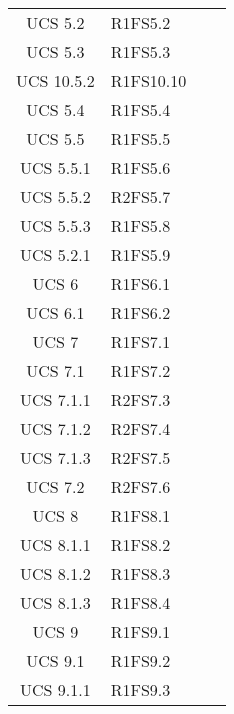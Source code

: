 {\begin{longtable}{ c C{4cm} c c}
UCS 5.2 & R1FS5.2\\

UCS 5.3 & R1FS5.3\\

UCS 10.5.2 & R1FS10.10\\

UCS 5.4 & R1FS5.4\\

UCS 5.5 & R1FS5.5\\


UCS 5.5.1 & R1FS5.6\\

UCS 5.5.2 & R2FS5.7\\

UCS 5.5.3 & R1FS5.8\\

UCS 5.2.1 & R1FS5.9\\

UCS 6 & R1FS6.1\\

UCS 6.1 & R1FS6.2\\

UCS 7 & R1FS7.1\\

UCS 7.1 & R1FS7.2\\

UCS 7.1.1 & R2FS7.3\\

UCS 7.1.2 & R2FS7.4\\

UCS 7.1.3 & R2FS7.5\\

UCS 7.2 & R2FS7.6\\

UCS 8 & R1FS8.1\\


UCS 8.1.1 & R1FS8.2\\

UCS 8.1.2 & R1FS8.3\\

UCS 8.1.3 & R1FS8.4\\

UCS 9 & R1FS9.1\\

UCS 9.1 & R1FS9.2\\


UCS 9.1.1 & R1FS9.3\\


\end{longtable}}
